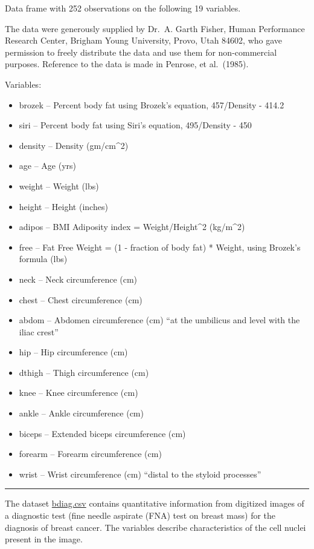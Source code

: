 \documentclass[
]{book}
\providecommand{\tightlist}{%
  \setlength{\itemsep}{0pt}\setlength{\parskip}{0pt}}
\begin{document}
Data frame with 252 observations on the following 19 variables.

The data were generously supplied by Dr.~A. Garth Fisher, Human
Performance Research Center, Brigham Young University, Provo, Utah
84602, who gave permission to freely distribute the data and use them
for non-commercial purposes. Reference to the data is made in Penrose,
et al.~(1985).

Variables:

\begin{itemize}
\tightlist
\item
  brozek -- Percent body fat using Brozek's equation, 457/Density - 414.2
\item
  siri -- Percent body fat using Siri's equation, 495/Density - 450
\item
  density -- Density (gm/cm\^{}2)
\item
  age -- Age (yrs)
\item
  weight -- Weight (lbs)
\item
  height -- Height (inches)
\item
  adipos -- BMI Adiposity index = Weight/Height\^{}2 (kg/m\^{}2)
\item
  free -- Fat Free Weight = (1 - fraction of body fat) * Weight, using Brozek's formula (lbs)
\item
  neck -- Neck circumference (cm)
\item
  chest -- Chest circumference (cm)
\item
  abdom -- Abdomen circumference (cm) ``at the umbilicus and level with the iliac crest''
\item
  hip -- Hip circumference (cm)
\item
  dthigh -- Thigh circumference (cm)
\item
  knee -- Knee circumference (cm)
\item
  ankle -- Ankle circumference (cm)
\item
  biceps -- Extended biceps circumference (cm)
\item
  forearm -- Forearm circumference (cm)
\item
  wrist -- Wrist circumference (cm) ``distal to the styloid processes''
\end{itemize}

\begin{center}\rule{0.5\linewidth}{0.5pt}\end{center}

The dataset \href{https://www.dropbox.com/s/vp44yozebx5xgok/bdiag.csv?dl=0}{bdiag.csv}
contains quantitative information from digitized images of a diagnostic test
(fine needle aspirate (FNA) test on breast mass) for the diagnosis of breast
cancer. The variables describe characteristics of the cell nuclei present in
the image.
\end{document}
